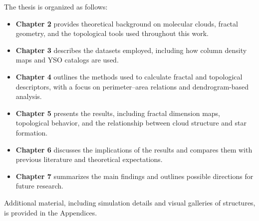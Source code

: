 The thesis is organized as follows:
\begin{itemize}
    \item \textbf{Chapter 2} provides theoretical background on molecular clouds, fractal geometry, and the topological tools used throughout this work.
    \item \textbf{Chapter 3} describes the datasets employed, including how column density maps and YSO catalogs are used.
    \item \textbf{Chapter 4} outlines the methods used to calculate fractal and topological descriptors, with a focus on perimeter–area relations and dendrogram-based analysis.
    \item \textbf{Chapter 5} presents the results, including fractal dimension maps, topological behavior, and the relationship between cloud structure and star formation.
    \item \textbf{Chapter 6} discusses the implications of the results and compares them with previous literature and theoretical expectations.
    \item \textbf{Chapter 7} summarizes the main findings and outlines possible directions for future research.
\end{itemize}

Additional material, including simulation details and visual galleries of structures, is provided in the Appendices.
